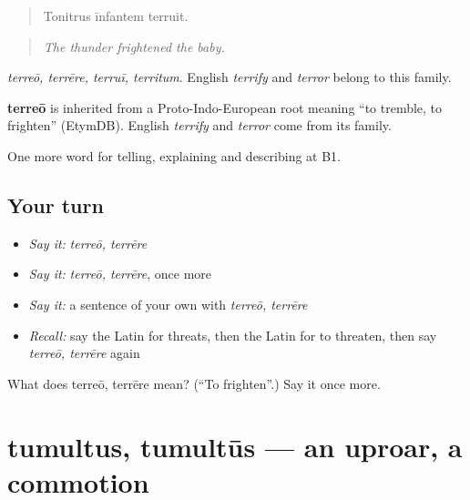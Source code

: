 \begin{quote}
Tonitrus īnfantem terruit.
\end{quote}

\begin{quote}
\emph{The thunder frightened the baby.}
\end{quote}

\emph{terreō, terrēre, terruī, territum}. English \emph{terrify} and \emph{terror} belong to this family.

\begin{cousinweb}
\textbf{terreō} is inherited from a Proto-Indo-European root meaning \textquotedblleft{}to tremble, to frighten\textquotedblright{} (EtymDB). English \emph{terrify} and \emph{terror} come from its family.
\end{cousinweb}

\begin{grammarlens}[title={What you've built}]
One more word for telling, explaining and describing at B1.
\end{grammarlens}

\subsection*{Your turn}
\begin{itemize}
\raggedright
  \item \emph{Say it:} \emph{terreō, terrēre}
  \item \emph{Say it:} \emph{terreō, terrēre}, once more
  \item \emph{Say it:} a sentence of your own with \emph{terreō, terrēre}
  \item \emph{Recall:} say the Latin for threats, then the Latin for to threaten, then say \emph{terreō, terrēre} again
\end{itemize}

\begin{tcolorbox}[breakable,colback=teal!4,colframe=teal!35!black,title={Before you move on}]
What does terreō, terrēre mean? (\textquotedblleft{}To frighten\textquotedblright{}.) Say it once more.
\end{tcolorbox}
\section[tumultus, tumultūs]{tumultus, tumultūs — an uproar, a commotion}

\label{lesson:LA-C321-tumultus}



